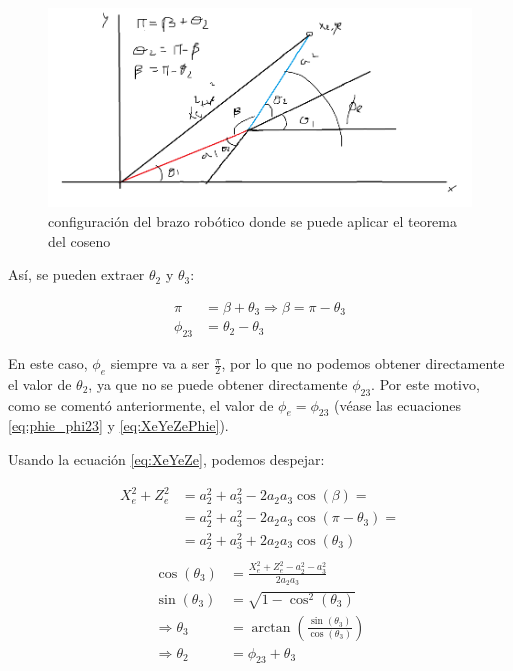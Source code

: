 \documentclass[a4paper,12pt]{article}
\begin{document}
\begin{figure}[H]
    \centering
    \includegraphics[width=.8\textwidth]{images/trigonometry.PNG}
    \caption{configuración del brazo robótico donde se puede aplicar el teorema del coseno}
    \label{fig:cos_theorem}
\end{figure}

Así, se pueden extraer $\theta_2$ y $\theta_3$:

\begin{align}
    \pi    & = \beta + \theta_3 \Longrightarrow \beta = \pi - \theta_3 \\
    \phi_{23} & = \theta_2 - \theta_3
\end{align}

En este caso, $\phi_e$ siempre va a ser $\frac{\pi}{2}$, por lo que no podemos obtener
directamente el valor de $\theta_2$, ya que no se puede obtener directamente $\phi_{23}$.
Por este motivo, como se comentó anteriormente, el valor de $\phi_e = \phi_{23}$
(véase las ecuaciones \ref{eq:phie_phi23} y \ref{eq:XeYeZePhie}).

Usando la ecuación \ref{eq:XeYeZe}, podemos despejar:

\begin{align*}
    X_e^2 + Z_e^2 & = a_2^2 + a_3^2 - 2a_2a_3\cos(\beta) =          \\
                  & = a_2^2 + a_3^2 - 2a_2a_3\cos(\pi - \theta_3) = \\
                  & = a_2^2 + a_3^2 + 2a_2a_3\cos(\theta_3)         \\
\end{align*}
\begin{align}
    \cos(\theta_3)           & = \frac{X_e^2 + Z_e^2 - a_2^2 - a_3^2}{2a_2a_3} \label{eq:cos_theta_3} \\
    \sin(\theta_3)           & = \sqrt{1 - \cos^2(\theta_3)} \label{eq:sin_theta_3}                   \\
    \Longrightarrow \theta_3 & = \arctan\left(\frac{\sin(\theta_3)}{\cos(\theta_3)}\right)
    \label{eq:theta_3}                                                                                \\
    \Longrightarrow \theta_2 & = \phi_{23} + \theta_3 \label{eq:theta_2}                                 \\
\end{align}
\end{document}
